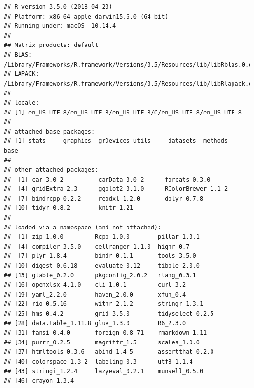 \documentclass[]{article}
\begin{document}
\begin{verbatim}
## R version 3.5.0 (2018-04-23)
## Platform: x86_64-apple-darwin15.6.0 (64-bit)
## Running under: macOS  10.14.4
## 
## Matrix products: default
## BLAS: /Library/Frameworks/R.framework/Versions/3.5/Resources/lib/libRblas.0.dylib
## LAPACK: /Library/Frameworks/R.framework/Versions/3.5/Resources/lib/libRlapack.dylib
## 
## locale:
## [1] en_US.UTF-8/en_US.UTF-8/en_US.UTF-8/C/en_US.UTF-8/en_US.UTF-8
## 
## attached base packages:
## [1] stats     graphics  grDevices utils     datasets  methods   base     
## 
## other attached packages:
##  [1] car_3.0-2          carData_3.0-2      forcats_0.3.0     
##  [4] gridExtra_2.3      ggplot2_3.1.0      RColorBrewer_1.1-2
##  [7] bindrcpp_0.2.2     readxl_1.2.0       dplyr_0.7.8       
## [10] tidyr_0.8.2        knitr_1.21        
## 
## loaded via a namespace (and not attached):
##  [1] zip_1.0.0         Rcpp_1.0.0        pillar_1.3.1     
##  [4] compiler_3.5.0    cellranger_1.1.0  highr_0.7        
##  [7] plyr_1.8.4        bindr_0.1.1       tools_3.5.0      
## [10] digest_0.6.18     evaluate_0.12     tibble_2.0.0     
## [13] gtable_0.2.0      pkgconfig_2.0.2   rlang_0.3.1      
## [16] openxlsx_4.1.0    cli_1.0.1         curl_3.2         
## [19] yaml_2.2.0        haven_2.0.0       xfun_0.4         
## [22] rio_0.5.16        withr_2.1.2       stringr_1.3.1    
## [25] hms_0.4.2         grid_3.5.0        tidyselect_0.2.5 
## [28] data.table_1.11.8 glue_1.3.0        R6_2.3.0         
## [31] fansi_0.4.0       foreign_0.8-71    rmarkdown_1.11   
## [34] purrr_0.2.5       magrittr_1.5      scales_1.0.0     
## [37] htmltools_0.3.6   abind_1.4-5       assertthat_0.2.0 
## [40] colorspace_1.3-2  labeling_0.3      utf8_1.1.4       
## [43] stringi_1.2.4     lazyeval_0.2.1    munsell_0.5.0    
## [46] crayon_1.3.4
\end{verbatim}
\end{document}
